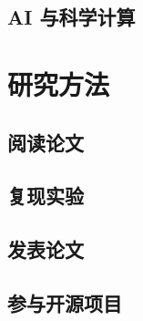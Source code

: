 \documentclass[12pt,UTF8]{ctexbook}
\begin{document}
\section{AI 与科学计算}

\chapter{研究方法}
\label{chap:research_methods}

\section{阅读论文}

\section{复现实验}

\section{发表论文}

\section{参与开源项目}

\backmatter
\end{document}
